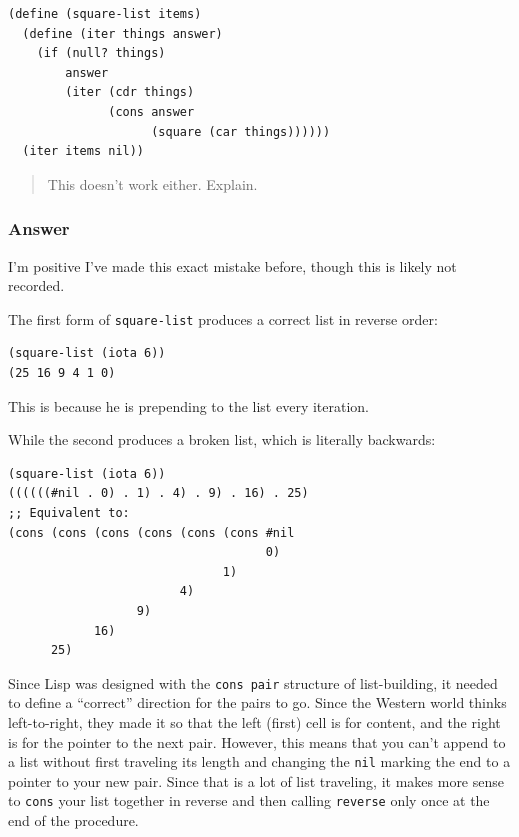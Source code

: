 \documentclass[final,fleqn,titlepage,twoside]{article}
\begin{document}
\begin{verbatim}
(define (square-list items)
  (define (iter things answer)
    (if (null? things)
        answer
        (iter (cdr things)
              (cons answer
                    (square (car things))))))
  (iter items nil))
\end{verbatim}

\begin{quote}
This doesn't work either.  Explain.
\end{quote}

\subsubsection{Answer}
\label{sec:org1827073}
I'm positive I've made this exact mistake before, though this is likely not
recorded.

The first form of \texttt{square-list} produces a correct list in reverse order:

\begin{verbatim}
(square-list (iota 6))
(25 16 9 4 1 0)
\end{verbatim}

This is because he is prepending to the list every iteration.

While the second produces a broken list, which is literally backwards:
\begin{verbatim}
(square-list (iota 6))
((((((#nil . 0) . 1) . 4) . 9) . 16) . 25)
;; Equivalent to:
(cons (cons (cons (cons (cons (cons #nil
                                    0)
                              1)
                        4)
                  9)
            16)
      25)
\end{verbatim}

Since Lisp was designed with the \texttt{cons pair} structure of list-building, it
needed to define a ``correct'' direction for the pairs to go. Since the Western
world thinks left-to-right, they made it so that the left (first) cell is for
content, and the right is for the pointer to the next pair. However, this means
that you can't append to a list without first traveling its length and changing
the \texttt{nil} marking the end to a pointer to your new pair. Since that is
a lot of list traveling, it makes more sense to \texttt{cons} your list
together in reverse and then calling \texttt{reverse} only once at the end of
the procedure.
\end{document}
